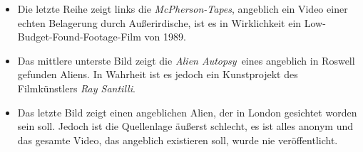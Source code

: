 \documentclass{scrartcl}
\begin{document}
\begin{itemize}
	\item Die letzte Reihe zeigt links die \textit{McPherson-Tapes}, angeblich ein Video einer echten Belagerung durch Außerirdische, ist es in Wirklichkeit ein Low-Budget-Found-Footage-Film von 1989. 
	\item Das mittlere unterste Bild zeigt die \frqq\textit{Alien Autopsy}\flqq\ eines angeblich in Roswell gefunden Aliens. In Wahrheit ist es jedoch ein Kunstprojekt des Filmkünstlers \textit{Ray Santilli}. 
	\item Das letzte Bild zeigt einen angeblichen Alien, der in London gesichtet worden sein soll. Jedoch ist die Quellenlage äußerst schlecht, es ist alles anonym und das gesamte \frqq Video\flqq, das angeblich existieren soll, wurde nie veröffentlicht. 
\end{itemize}
\end{document}
